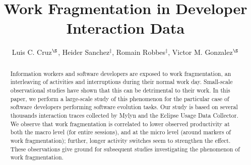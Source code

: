 \documentclass[times]{smrauth}
\begin{document}
%


\title{ Work Fragmentation in Developer Interaction Data}

\author{Luis C. Cruz$^{\S}$, Heider Sanchez$^{\ddagger}$, Romain Robbes$^{\ddagger}$, Victor M. Gonzalez$^{\S}$}

\address{$^{\ddagger}$: Computer Science Department (DCC), University of Chile, Chile;
$^{\S}$: Instituto Tecnologico Autonomo de Mexico, Mexico}


\maketitle





\begin{abstract}
Information workers and software developers are exposed to work fragmentation, an interleaving of activities and interruptions during their normal work day. Small-scale observational studies have shown that this can be detrimental to their work. In this paper, we perform a large-scale study of this phenomenon for the particular case of software developers performing software evolution tasks. Our study is based on several thousands interaction traces collected by Mylyn and the Eclipse Usage Data Collector. We observe that work fragmentation is correlated to lower observed productivity at both the macro level (for entire sessions), and at the micro level (around markers of work fragmentation); further, longer activity switches seem to strengthen the effect. These observations give ground for subsequent studies investigating the phenomenon of work fragmentation.
\end{abstract}


\end{document}
